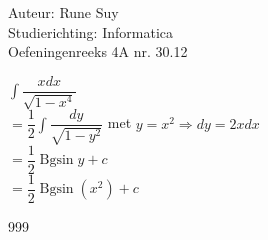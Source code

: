 \documentclass[a4paper]{article}
\newcommand{\Bgsin}{\operatorname{Bgsin}}
\newcommand{\Int}{\displaystyle\int}
\begin{document}
  
\noindent \large Auteur: Rune Suy \\
\noindent \large Studierichting: Informatica\\
\noindent \large Oefeningenreeks 4A nr. 30.12\\

\medskip

\normalsize

$\Int \dfrac{xdx}{\sqrt{1-x^4}}$\\

$=\dfrac{1}{2} \Int \dfrac{dy}{\sqrt{1-y^2}}$ met $y=x^2 \Rightarrow dy = 2xdx$\\

$=\dfrac{1}{2}\Bgsin y + c$\\

$=\dfrac{1}{2}\Bgsin (x^2) + c$\\

\begin{thebibliography}{999}
\end{thebibliography}
\end{document}
